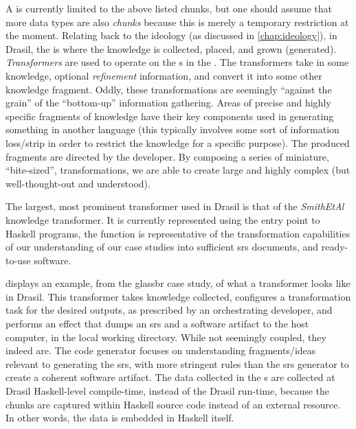A \ChunkDB{} is currently limited to the above listed chunks, but one should assume that more data types are also
\textit{chunks} because this is merely a temporary restriction at the
moment. Relating back to the ideology (as discussed in
\autoref{chap:ideology}), in Drasil, the \ChunkDB{} is where the knowledge
is collected, placed, and grown (generated). \textit{Transformers} are
used to operate on the \Chunk{}s in the \ChunkDB{}. The transformers take
in some knowledge, optional \textit{refinement} information, and convert
it into some other knowledge fragment. Oddly,
these transformations are seemingly ``against the grain'' of the
``bottom-up'' information gathering. Areas of precise and highly specific
fragments of knowledge have their key components used in generating
something in another language (this typically involves some sort of
information loss/strip in order to restrict the knowledge for a specific
purpose). The produced fragments are directed by the developer. By
composing a series of miniature, ``bite-sized'', transformations, we are
able to create large and highly complex (but well-thought-out and
understood).

The largest, most prominent transformer used in Drasil is that of the
\textit{SmithEtAl} knowledge transformer. It is currently represented using the entry point to Haskell
programs, the  function is representative of the
transformation capabilities of our understanding of our case studies into
sufficient \acs{srs} documents, and ready-to-use software.


 displays an example, from the
\acs{glassbr} case study, of what a transformer looks like in Drasil. This
transformer takes knowledge collected, configures a transformation task for the
desired outputs, as prescribed by an orchestrating developer, and performs an
 effect that dumps an \acs{srs} and a software artifact to the
host computer, in the local working directory. While not seemingly coupled, they
indeed are. The code generator focuses on understanding fragments/ideas relevant
to generating the \acs{srs}, with more stringent rules than the \acs{srs}
generator to create a coherent software artifact. The data collected in the
\ChunkDB{}s are collected at Drasil Haskell-level compile-time, instead of the
Drasil run-time, because the chunks are captured within Haskell source code
instead of an external resource. In other words, the data is embedded in Haskell
itself.

